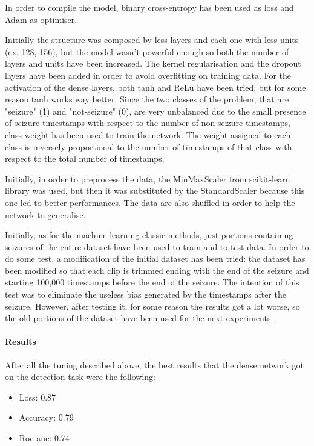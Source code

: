 In order to compile the model, binary cross-entropy has been used as loss and Adam as optimiser.

Initially the structure was composed by less layers and each one with less units (ex. 128, 156), but the model wasn't powerful enough so both the number of layers and units have been increased. The kernel regularisation and the dropout layers have been added in order to avoid overfitting on training data. For the activation of the dense layers, both tanh and ReLu have been tried, but for some reason tanh works way better. Since the two classes of the problem, that are "seizure" (1) and "not-seizure" (0), are very unbalanced due to the small presence of seizure timestamps with respect to the number of non-seizure timestamps, class weight has been used to train the network. The weight assigned to each class is inversely proportional to the number of timestamps of that class with respect to the total number of timestamps.

Initially, in order to preprocess the data, the MinMaxScaler from scikit-learn library was used, but then it was substituted by the StandardScaler because this one led to better performances. The data are also shuffled in order to help the network to generalise.

Initially, as for the machine learning classic methods, just portions containing seizures of the entire dataset have been used to train and to test data. In order to do some test, a modification of the initial dataset has been tried: the dataset has been modified so that each clip is trimmed ending with the end of the seizure and starting 100,000 timestamps before the end of the seizure. The intention of this test was to eliminate the useless bias generated by the timestamps after the seizure. However, after testing it, for some reason the results got a lot worse, so the old portions of the dataset have been used for the next experiments.

\paragraph{Results} After all the tuning described above, the best results that the dense network got on the detection task were the following:
\begin{itemize}
    \item Loss: 0.87
    \item Accuracy: 0.79
    \item Roc auc: 0.74
\end{itemize}

